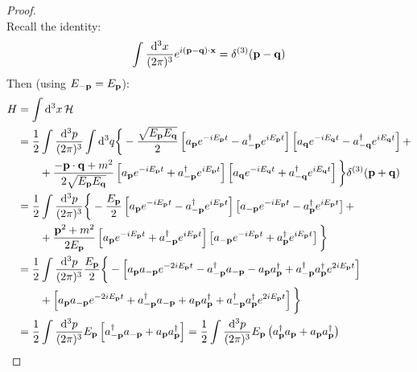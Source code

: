 \begin{proofbox}
\begin{proof}
\begin{equation*}
    \end{equation*}
    Recall the identity:
    \begin{equation}
      \int \frac{\mathrm{d}^3x}{(2\pi)^3} e^{i (\mathbf{p} - \mathbf{q}) \cdot \mathbf{x}} = \delta^{(3)}(\mathbf{p} - \mathbf{q})
      \label{eq:fourier-delta}
    \end{equation}
    Then (using $ E_{-\mathbf{p}} = E_{\mathbf{p}} $):
    \begin{equation*}
      \begin{split}
        H
        &= \int \mathrm{d}^3x\, \mathcal{H} \\
        &= \frac{1}{2} \int \frac{\mathrm{d}^3 p}{(2\pi)^3} \int \mathrm{d}^3 q \bigg\{ - \frac{\sqrt{E_{\mathbf{p}} E_{\mathbf{q}}}}{2} \left[ a_{\mathbf{p}} e^{-i E_{\mathbf{p}} t} - a_{-\mathbf{p}}^\dagger e^{i E_{\mathbf{p}} t} \right] \left[ a_{\mathbf{q}} e^{-i E_{\mathbf{q}} t} - a_{-\mathbf{q}}^\dagger e^{i E_{\mathbf{q}} t} \right] + \\
        & \qquad + \frac{- \mathbf{p} \cdot \mathbf{q} + m^2}{2\sqrt{E_{\mathbf{p}} E_{\mathbf{q}}}} \left[ a_{\mathbf{p}} e^{-i E_{\mathbf{p}} t} + a_{-\mathbf{p}}^\dagger e^{i E_{\mathbf{p}} t} \right] \left[ a_{\mathbf{q}} e^{-i E_{\mathbf{q}} t} + a_{-\mathbf{q}}^\dagger e^{i E_{\mathbf{q}} t} \right] \bigg\} \delta^{(3)}(\mathbf{p} + \mathbf{q}) \\
        &= \frac{1}{2} \int \frac{\mathrm{d}^3 p}{(2\pi)^3} \bigg\{ - \frac{E_{\mathbf{p}}}{2} \left[ a_{\mathbf{p}} e^{-i E_{\mathbf{p}} t} - a_{-\mathbf{p}}^\dagger e^{i E_{\mathbf{p}} t} \right] \left[ a_{-\mathbf{p}} e^{-i E_{\mathbf{p}} t} - a_{\mathbf{p}}^\dagger e^{i E_{\mathbf{p}} t} \right] + \\
        & \qquad + \frac{\mathbf{p}^2 + m^2}{2E_{\mathbf{p}}} \left[ a_{\mathbf{p}} e^{-i E_{\mathbf{p}} t} + a_{-\mathbf{p}}^\dagger e^{i E_{\mathbf{p}} t} \right] \left[ a_{-\mathbf{p}} e^{-i E_{\mathbf{p}} t} + a_{\mathbf{p}}^\dagger e^{i E_{\mathbf{p}} t} \right] \bigg\} \\
        &= \frac{1}{2} \int \frac{\mathrm{d}^3p}{(2\pi)^3} \frac{E_{\mathbf{p}}}{2} \bigg\{ - \left[ a_{\mathbf{p}} a_{-\mathbf{p}} e^{-2i E_{\mathbf{p}} t} - a_{-\mathbf{p}}^\dagger a_{-\mathbf{p}} - a_{\mathbf{p}} a_{\mathbf{p}}^\dagger + a_{-\mathbf{p}}^\dagger a_{\mathbf{p}}^\dagger e^{2i E_{\mathbf{p}} t} \right] \\
        & \qquad + \left[ a_{\mathbf{p}} a_{-\mathbf{p}} e^{-2i E_{\mathbf{p}} t} + a_{-\mathbf{p}}^\dagger a_{-\mathbf{p}} + a_{\mathbf{p}} a_{\mathbf{p}}^\dagger + a_{-\mathbf{p}}^\dagger a_{\mathbf{p}}^\dagger e^{2i E_{\mathbf{p}} t} \right] \bigg\} \\
        &= \frac{1}{2} \int \frac{\mathrm{d}^3p}{(2\pi)^3} E_{\mathbf{p}} \left[ a_{-\mathbf{p}}^\dagger a_{-\mathbf{p}} + a_{\mathbf{p}} a_{\mathbf{p}}^\dagger \right] = \frac{1}{2} \int \frac{\mathrm{d}^3p}{(2\pi)^3} E_{\mathbf{p}} \left( a_{\mathbf{p}}^\dagger a_{\mathbf{p}} + a_{\mathbf{p}} a_{\mathbf{p}}^\dagger \right)
      \end{split}
    \end{equation*}
  \end{proof}
\end{proofbox}

